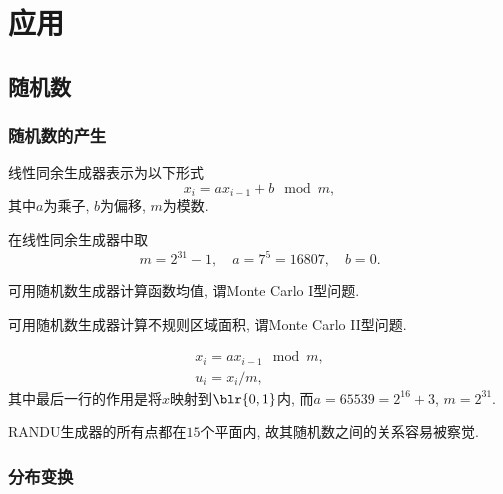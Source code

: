 \documentclass{ctexart}
\begin{document}
\section{应用} %
\label{sec:应用}

\subsection{随机数} %
\label{sub:随机数}

\subsubsection{随机数的产生} %
\label{ssub:随机数的产生}

\begin{definition}
    线性同余生成器表示为以下形式
    \[ x_i = ax_{i-1} + b {\mod m}, \]
    其中$a$为乘子, $b$为偏移, $m$为模数.
\end{definition}
\begin{definition}[最小标准随机数生成器]
    在线性同余生成器中取
    \[ m = 2^{31} - 1,\quad a = 7^5 = 16807,\quad b = 0. \]
\end{definition}
\begin{ex}
    可用随机数生成器计算函数均值, 谓Monte Carlo I型问题.
\end{ex}
\begin{ex}
    可用随机数生成器计算不规则区域面积, 谓Monte Carlo II型问题.
\end{ex}
\begin{definition}[RANDU生成器]
    \begin{align*}
        x_i = ax_{i-1} {\mod m}, \\
        u_i = x_i / m,
    \end{align*}
    其中最后一行的作用是将$x$映射到$\blr{0,1}$内, 而$a = 65539 = 2^{16}+3$, $m=2^{31}$.
\end{definition}
RANDU生成器的所有点都在$15$个平面内, 故其随机数之间的关系容易被察觉.


\subsubsection{分布变换} %
\label{ssub:分布变换}
\end{document}
